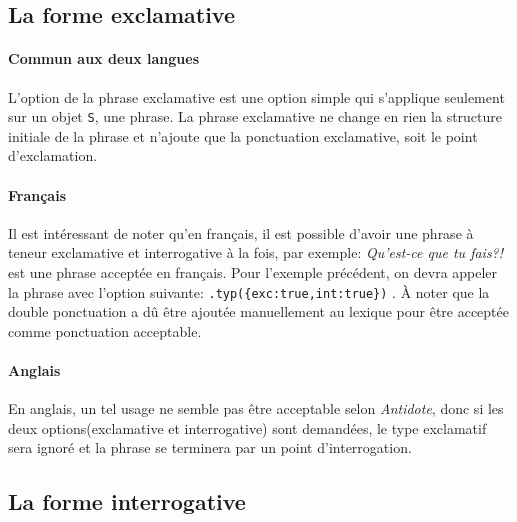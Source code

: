 \documentclass[11pt]{article} %
\begin{document}
\subsection{La forme exclamative}

\paragraph{Commun aux deux langues}

L'option de la phrase exclamative est une option simple qui s'applique
seulement sur un objet \texttt{S}, une phrase. La phrase exclamative
ne change en rien la structure initiale de la phrase et n'ajoute que
la ponctuation exclamative, soit le point d'exclamation. 

\paragraph{Français}
Il est intéressant
de noter qu'en français, il est possible d'avoir une phrase à teneur
exclamative et interrogative à la fois, par exemple: \emph{Qu'est-ce
que tu fais?!} est une phrase acceptée en français. Pour
l'exemple précédent, on devra appeler la phrase avec l'option suivante:
\texttt{.typ(\{exc:true,int:true\})} . À noter que la double ponctuation a dû être ajoutée
manuellement au lexique pour être acceptée comme ponctuation acceptable.

\paragraph{Anglais}
En anglais, un tel usage ne semble pas être acceptable selon \emph{Antidote},
donc si les deux options(exclamative et interrogative) sont demandées, le type 
exclamatif sera ignoré et la phrase se terminera par un point d'interrogation.

\subsection{La forme interrogative}
\label{question}
\end{document}
